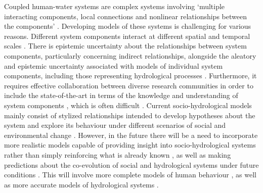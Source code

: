 \documentclass{icldt}\usepackage[]{graphicx}\usepackage[]{color}
\begin{document}
Coupled human-water systems are complex systems involving `multiple interacting components, local connections and nonlinear relationships between the components' \citep{troy2015}. Developing models of these systems is challenging for various reasons. Different system components interact at different spatial and temporal scales \citep{elshafei2014}. There is epistemic uncertainty about the relationships between system components, particularly concerning indirect relationships, alongside the aleatory and epistemic uncertainty associated with models of individual system components, including those representing hydrological processes \citep{elshafei2014,dibaldassare2015-a,mount2016}. Furthermore, it requires effective collaboration between diverse research communities in order to include the state-of-the-art in terms of the knowledge and understanding of system components \citep{blair2016}, which is often difficult \citep{montanari2013}. Current socio-hydrological models mainly consist of stylized relationships intended to develop hypotheses about the system and explore its behaviour under different scenarios of social and environmental change \citep[e.g.][]{vanemmerik2014,dibaldassare2015-a,garcia2016}. However, in the future there will be a need to incorporate more realistic models capable of providing insight into socio-hydrological systems rather than simply reinforcing what is already known \citep{troy2015,loucks2015,blair2016}, as well as making predictions about the co-evolution of social and hydrological systems under future conditions \citep{}. This will involve more complete models of human behaviour \citep{loucks2015}, as well as more accurate models of hydrological systems \citep{gober2015,mount2016}. \\


\end{document}
